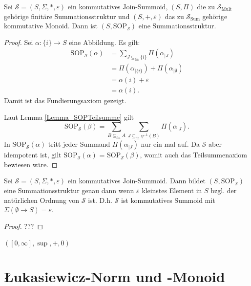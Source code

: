 \documentclass{article}
\begin{document}
\begin{theorem}
  Sei $\mathcal{S} = (S, \Sigma, \ast, \varepsilon)$ ein kommutatives Join-Summoid,
  $(S, \Pi)$ die zu $\mathcal{S}_\text{Mult}$ gehörige finitäre Summationsstruktur
  und $(S, +, \varepsilon)$ das zu $\mathcal{S}_\text{Sum}$ gehörige kommutative Monoid.
  Dann ist $(S, \text{SOP}_\mathcal{S})$ eine Summationsstruktur.
\end{theorem}
\begin{proof}
  Sei $\alpha \colon \{i\} \to S$ eine Abbildung.
  Es gilt:
  \begin{align*}
    \text{SOP}_\mathcal{S}(\alpha) &= \sum_{J \subseteq_{\text{fin}} \{i\}}\Pi(\alpha_{\mid J}) \\
    &= \Pi(\alpha_{\mid \{i\}}) + \Pi(\alpha_{\mid \emptyset}) \\
    &= \alpha(i) + \varepsilon \\
    &= \alpha(i).
  \end{align*}
  Damit ist das Fundierungsaxiom gezeigt. 
  
  Laut Lemma \ref{Lemma_SOPTeilsumme} gilt
  \begin{equation*}
    \text{SOP}_\mathcal{S}(\beta) = \sum_{B \subseteq_\text{fin} A}\sum_{J \subseteq_\text{fin} \eta^{-1}(B)}\Pi(\alpha_{\mid J}).
  \end{equation*}
  In $\text{SOP}_\mathcal{S}(\alpha)$ tritt jeder Summand $\Pi(\alpha_{\mid J})$ nur ein mal auf.
  Da $\mathcal{S}$ aber idempotent ist, gilt $\text{SOP}_\mathcal{S}(\alpha)$ = $\text{SOP}_\mathcal{S}(\beta)$,
  womit auch das Teilsummenaxiom bewiesen wäre.
\end{proof}

\begin{theorem}
  Sei $\mathcal{S} = (S, \Sigma, \ast, \varepsilon)$ ein kommutatives Join-Summoid.
  Dann bildet $(S, \text{SOP}_\mathcal{S})$ eine Summationsstruktur genau dann
  wenn $\varepsilon$ kleinstes Element in $S$ bzgl. der natürlichen Ordnung von $\mathcal{S}$ ist.
  D.h. $\mathcal{S}$ ist kommutatives Summoid mit $\Sigma(\emptyset \to S) = \varepsilon$.
\end{theorem}
\begin{proof}
  ???
\end{proof}

\begin{example}
  $([0, \infty], \sup, +, 0)$
\end{example}

\newpage
\section{Łukasiewicz-Norm und -Monoid}
\end{document}
